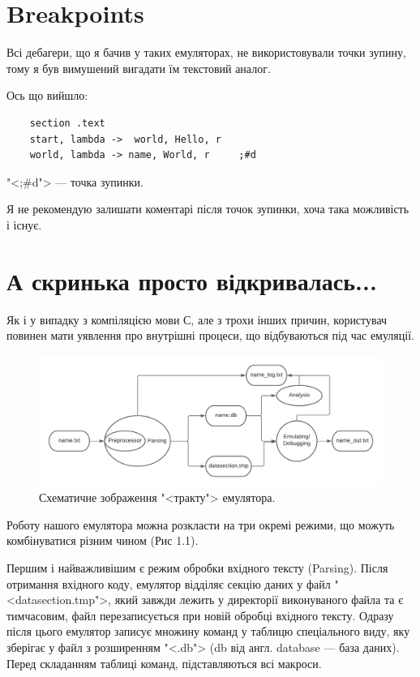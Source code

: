 \documentclass[oneside,final,14pt]{extreport}
\begin{document}
\section{Breakpoints}
Всі дебагери, що я бачив у таких емуляторах, не використовували точки зупину, тому я був вимушений вигадати їм текстовий аналог.

Ось що вийшло:

\begin{Verbatim}
	section .text
	start, lambda ->  world, Hello, r	  
	world, lambda -> name, World, r	    ;#d
\end{Verbatim}
"<;\#d"> --- точка зупинки. 

Я не рекомендую залишати коментарі після точок зупинки, хоча така можливість і існує.
\section{А скринька просто відкривалась...}
\label{chap:emulator:func}
Як і у випадку з компіляцією мови С, але з трохи інших причин, користувач повинен мати уявлення про внутрішні процеси, що відбуваються під час емуляції.

\begin{figure}
\includegraphics[scale=0.8]{2}
\caption{Схематичне зображення "<тракту"> емулятора.}
\end{figure}

Роботу нашого емулятора можна розкласти на три окремі режими, що можуть комбінуватися різним чином (Рис 1.1).

Першим і найважливішим є режим обробки вхідного тексту (Parsing). Після отримання вхідного коду, емулятор відділяє секцію даних у файл "<datasection.tmp">, який завжди лежить у директорії виконуваного файла та є тимчасовим, файл перезаписується при новій обробці вхідного тексту. Одразу після цього емулятор записує множину команд у таблицю спеціального виду, яку зберігає у файл з розширенням "<.db"> (db від англ. database --- база даних). Перед складанням таблиці команд, підставляються всі макроси.
\end{document}
